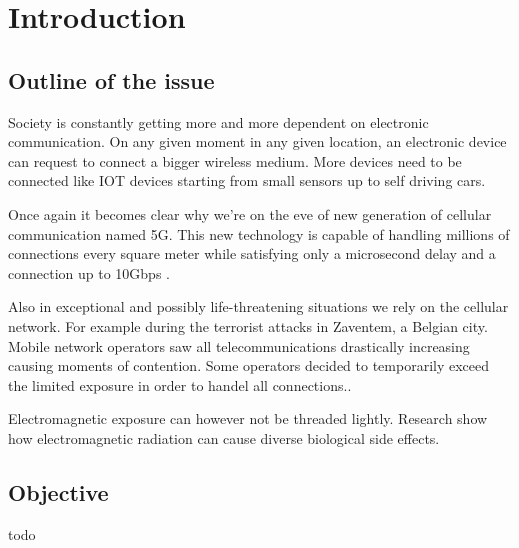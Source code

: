 %

\chapter{Introduction}
\label{chap:intro}

\section{Outline of the issue}
\label{sec:issue}

Society is constantly getting more and more dependent on electronic communication. On any given moment in any given location, an electronic device
can request to connect a bigger wireless medium. More devices need to be connected like IOT devices starting from small sensors up to self driving cars.

Once again it becomes clear why we're on the eve of new generation of cellular communication named 5G. 
This new technology is capable of handling millions of connections every square meter %
while satisfying only a microsecond delay and a connection up to 10Gbps \cite{bioeffects}.

Also in exceptional and possibly life-threatening situations we rely on the cellular network. For example during the terrorist attacks in Zaventem, a Belgian city.
Mobile network operators saw all telecommunications drastically increasing causing moments of contention. Some operators decided to temporarily exceed the limited exposure in
order to handel all connections.. \cite{baseZaventem}

Electromagnetic exposure can however not be threaded lightly. Research show how electromagnetic radiation can cause diverse biological side effects. \cite{bio-effects}

\section{Objective}
\label{sec:objective}

todo